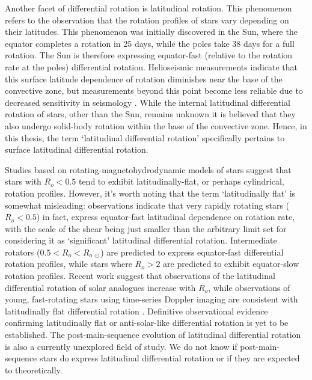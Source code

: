 Another facet of differential rotation is latitudinal rotation.
This phenomenon refers to the observation that the rotation profiles of stars vary depending on their latitudes. 
This phenomenon was initially discovered in the Sun, where the equator completes a rotation in 25 days, while the poles take 38 days for a full rotation. 
The Sun is therefore expressing equator-fast (relative to the rotation rate at the poles) differential rotation.
Helioseismic measurements indicate that this surface latitude dependence of rotation diminishes near the base of the convective zone, but measurements beyond this point become less reliable due to decreased sensitivity in seismology \citep{howe_solar_2009}.
While the internal latitudinal differential rotation of stars, other than the Sun, remains unknown it is believed that they also undergo solid-body rotation within the base of the convective zone. Hence, in this thesis, the term `latitudinal differential rotation' specifically pertains to surface latitudinal differential rotation.

Studies based on rotating-magnetohydrodynamic models of stars \citep{brun_powering_2022} suggest that stars with $R_o < 0.5$ tend to exhibit latitudinally-flat, or perhaps cylindrical, rotation profiles.
However, it's worth noting that the term `latitudinally flat' is somewhat misleading: observations indicate that very rapidly rotating stars ($R_o < 0.5$) in fact, express equator-fast latitudinal dependence on rotation rate, with the scale of the shear being just smaller than the arbitrary limit set for considering it as `significant' latitudinal differential rotation.
Intermediate rotators ($0.5<R_o< R_{o \ \odot}$) are predicted to express equator-fast differential rotation profiles, while stars where $R_o>2$ are predicted to exhibit equator-slow rotation profiles.
Recent work \citep{benomar_asteroseismic_2018} suggest that observations of the latitudinal differential rotation of solar analogues increase with $R_o$, while observations of young, fast-rotating stars using time-series Doppler imaging are consistent with latitudinally flat differential rotation \citep[see, e.g.,][]{lanza_evaluation_1996}.
Definitive observational evidence confirming latitudinally flat or anti-solar-like differential rotation is yet to be established.
The post-main-sequence evolution of latitudinal differential rotation is also a currently unexplored field of study.
We do not know if post-main-sequence stars do express latitudinal differential rotation or if they are expected to theoretically.


